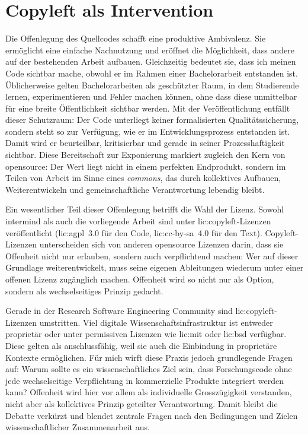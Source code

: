 \section{Copyleft als Intervention}

Die Offenlegung des Quellcodes schafft eine produktive Ambivalenz. Sie ermöglicht eine einfache Nachnutzung und eröffnet die Möglichkeit, dass andere auf der bestehenden Arbeit aufbauen. Gleichzeitig bedeutet sie, dass ich meinen Code sichtbar mache, obwohl er im Rahmen einer Bachelorarbeit entstanden ist. Üblicherweise gelten Bachelorarbeiten als geschützter Raum, in dem Studierende lernen, experimentieren und Fehler machen können, ohne dass diese unmittelbar für eine breite Öffentlichkeit sichtbar werden. Mit der Veröffentlichung entfällt dieser Schutzraum: Der Code unterliegt keiner formalisierten Qualitätssicherung, sondern steht so zur Verfügung, wie er im Entwicklungsprozess entstanden ist. Damit wird er beurteilbar, kritisierbar und gerade in seiner Prozesshaftigkeit sichtbar. Diese Bereitschaft zur Exponierung markiert zugleich den Kern von \gls{opensource}: Der Wert liegt nicht in einem perfekten Endprodukt, sondern im Teilen von Arbeit im Sinne eines \emph{commons}, das durch kollektives Aufbauen, Weiterentwickeln und gemeinschaftliche Verantwortung lebendig bleibt.

Ein wesentlicher Teil dieser Offenlegung betrifft die Wahl der Lizenz. Sowohl \gls{intermind} als auch die vorliegende Arbeit sind unter \gls{lic:copyleft}-Lizenzen veröffentlicht (\gls{lic:agpl}~3.0 für den Code, \gls{lic:cc-by-sa}~4.0 für den Text). Copyleft-Lizenzen unterscheiden sich von anderen \gls{opensource} Lizenzen darin, dass sie Offenheit nicht nur erlauben, sondern auch verpflichtend machen: Wer auf dieser Grundlage weiterentwickelt, muss seine eigenen Ableitungen wiederum unter einer offenen Lizenz zugänglich machen. Offenheit wird so nicht nur als Option, sondern als wechselseitiges Prinzip gedacht. 

Gerade in der Research Software Engineering Community sind \gls{lic:copyleft}-Lizenzen umstritten. Viel digitale Wissenschaftsinfrastruktur ist entweder proprietär oder unter permissiven Lizenzen wie \gls{lic:mit} oder \gls{lic:bsd} \parencite{sethiWhyEarthAre2020} verfügbar. Diese gelten als anschlussfähig, weil sie auch die Einbindung in proprietäre Kontexte ermöglichen. Für mich wirft diese Praxis jedoch grundlegende Fragen auf: Warum sollte es ein wissenschaftliches Ziel sein, dass Forschungscode ohne jede wechselseitige Verpflichtung in kommerzielle Produkte integriert werden kann? Offenheit wird hier vor allem als individuelle Grosszügigkeit verstanden, nicht aber als kollektives Prinzip geteilter Verantwortung. Damit bleibt die Debatte verkürzt und blendet zentrale Fragen nach den Bedingungen und Zielen wissenschaftlicher Zusammenarbeit aus.

